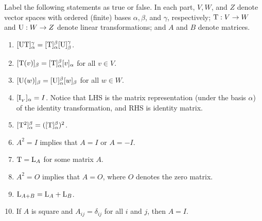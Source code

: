 \exercisesection

\begin{exercise} \label{exercise 2.3.1}
Label the following statements as true or false.
In each part, \(V, W\), and \(Z\) denote vector spaces with ordered (finite) bases \(\alpha, \beta\), and \(\gamma\), respectively;
\(\mathrm{T} : V \to W\) and \(\mathrm{U} : W \to Z\) denote linear transformations;
and \(A\) and \(B\) denote matrices.

\begin{enumerate}
\item \([\mathrm{U}\mathrm{T}]_{\alpha}^{\gamma} = [\mathrm{T}]_{\alpha}^{\beta}[\mathrm{U}]_{\beta}^{\gamma}\).
\item \([\mathrm{T}(v)]_{\beta} = [\mathrm{T}]_{\alpha}^{\beta}[v]_{\alpha}\) for all \(v \in V\).
\item \([\mathrm{U}(w)]_{\beta} = [\mathrm{U}]_{\alpha}^{\beta}[w]_{\beta}\) for all \(w \in W\).
\item \([\mathrm{I}_{_V}]_{\alpha} = I\).
    Notice that LHS is the matrix representation (under the basis \(\alpha\)) of the identity transformation,
    and RHS is identity matrix.
\item \([\mathrm{T}^2]_{\alpha}^{\beta} = ([\mathrm{T}]_{\alpha}^{\beta})^2\).
\item \(A^2 = I\) implies that \(A = I\) or \(A = -I\).
\item \(\mathrm{T} = \mathrm{L}_A\) for some matrix \(A\).
\item \(A^2 = O\) implies that \(A = O\), where \(O\) denotes the zero matrix.
\item \(\mathrm{L}_{A + B} = \mathrm{L}_A + \mathrm{L}_B\).
\item If \(A\) is square and \(A_{ij} = \delta_{ij}\) for all \(i\) and \(j\), then \(A = I\).
\end{enumerate}
\end{exercise}

